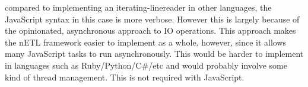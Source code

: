 compared to implementing an iterating-linereader in other languages, the JavaScript syntax in this case is more verbose. However this is largely because of the opinionated, asynchronous approach to IO operations. This approach makes the nETL framework easier to implement as a whole, however, since it allows many JavaScript tasks to run asynchronously. This would be harder to implement in languages such as Ruby/Python/C\#/etc and would probably involve some kind of thread management. This is not required with JavaScript.